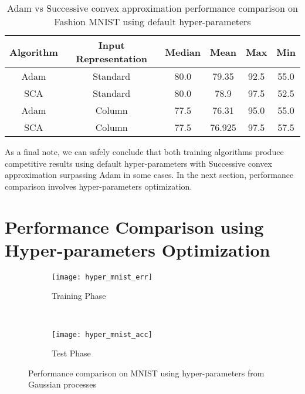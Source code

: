 \begin{table}
\begin{center}
 \begin{tabular}{||c|| c ||c|| c|| c|| c||} 
 \hline
 Algorithm & Input Representation & Median & Mean & Max & Min \\ [0.5ex] 
 \hline\hline
 Adam & Standard & 80.0 & 79.35 & 92.5 & 55.0 \\ 
 \hline
 SCA & Standard & 80.0 & 78.9 & 97.5 & 52.5 \\
 \hline
 Adam & Column & 77.5 & 76.31 & 95.0 & 55.0\\
 \hline
 SCA & Column & 77.5 & 76.925 & 97.5 & 57.5  \\
 \hline
\end{tabular}
\end{center}
\caption{Adam vs Successive convex approximation performance comparison on Fashion MNIST using default hyper-parameters}
\end{table}

As a final note, we can safely conclude that both training algorithms produce competitive results using default hyper-parameters with Successive convex approximation surpassing Adam in some cases. In the next section, performance comparison involves hyper-parameters optimization.

\newpage

\section {Performance Comparison using Hyper-parameters Optimization}

\begin{figure*}[t!]
    \centering
    \begin{subfigure}[t]{0.5\textwidth}
        \centering
        \texttt{[image: hyper\_mnist\_err]}
        \caption{Training Phase}
    \end{subfigure}%
    ~ 
    \begin{subfigure}[t]{0.5\textwidth}
        \centering
        \texttt{[image: hyper\_mnist\_acc]}
        \caption{Test Phase}
    \end{subfigure}
    \caption{Performance comparison on MNIST using hyper-parameters from Gaussian processes}
\end{figure*} 

